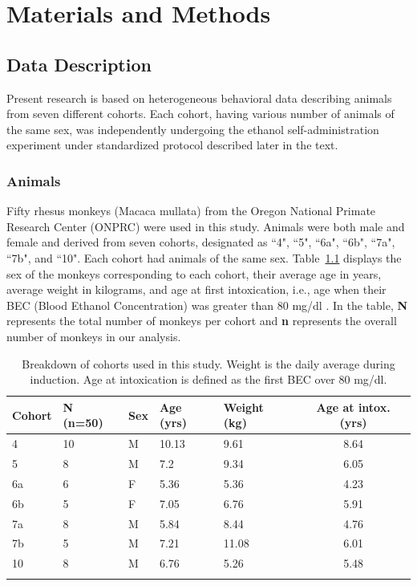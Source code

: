 \chapter{Materials and Methods}
\section{Data Description}
	Present research is based on heterogeneous behavioral data describing animals from seven different cohorts. Each cohort, having various number of animals of the same sex, was independently undergoing the ethanol self-administration experiment under standardized protocol described later in the text.
	
	\subsection{Animals}
	Fifty rhesus monkeys (Macaca mullata) from the Oregon National Primate Research Center (ONPRC) were used in this study. Animals were both male and female and derived from seven cohorts, designated as ``4", ``5", ``6a", ``6b", ``7a", ``7b", and ``10". Each cohort had animals of the same sex. Table~\ref{tab:data-breakdown} displays the sex of the monkeys corresponding to each cohort, their average age in years, average weight in kilograms, and age at first intoxication, i.e., age when their BEC (Blood Ethanol Concentration) was greater than 80 mg/dl . In the table, \textbf{N} represents the total number of monkeys per cohort and \textbf{n} represents the overall number of monkeys in our analysis.
	
	\begin{table}[htb]
		\centering
		\caption{Breakdown of cohorts used in this study. Weight is the daily average during induction. Age at intoxication is defined as the first BEC over 80 mg/dl.}
		\label{tab:data-breakdown}
		\begin{tabular}{lllllc}
			\hline
			\abovespace\belowspace
			Cohort & N (n=50) & Sex & Age (yrs) & Weight (kg) & Age at intox. (yrs) \\
			\hline
			4 		   & 10 & M & 10.13 & 9.61 & 8.64   \\
			5            & 8 & M & 7.2 & 9.34 & 6.05  \\
			6a           & 6 & F & 5.36 & 5.36 & 4.23 \\
			6b    		& 5 & F & 7.05 & 6.76 & 5.91  \\
			7a           & 8 & M & 5.84 & 8.44 & 4.76   \\
			7b    		& 5 & M & 7.21 & 11.08 & 6.01   \\
			10    		& 8 & M & 6.76 & 5.26 & 5.48   \\ 
			\belowspace \\
			\hline
		\end{tabular}
	\end{table}

